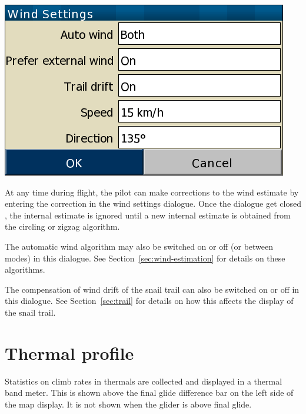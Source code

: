 \begin{center}
\includegraphics[angle=0,width=0.4\linewidth,keepaspectratio='true']{figures/dialog-wind2.png}
\end{center}

At any time during flight, the pilot can make corrections to the wind
estimate by entering the correction in the wind settings dialogue.  Once the
dialogue get closed , the internal estimate is ignored until a new internal
estimate is obtained from the circling or zigzag algorithm.

The automatic wind algorithm may also be switched on or off (or
between modes) in this dialogue.  See Section~\ref{sec:wind-estimation}
for details on these algorithms.

The compensation of wind drift of the snail trail can also be switched
on or off in this dialogue.  See Section~\ref{sec:trail} for details on
how this affects the display of the snail trail.

\section{Thermal profile}

Statistics on climb rates in thermals are collected and displayed in a
thermal band meter.  This is shown above the final glide difference
bar on the left side of the map display.  It is not shown when the
glider is above final glide.  

\vskip 2cm

